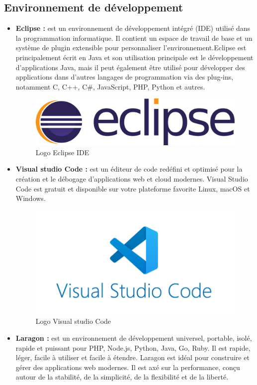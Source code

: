 \subsection[Environnement de développement]{Environnement de développement}
\begin{itemize}
	\item \textbf{Eclipse :} est un environnement de développement intégré (IDE) utilisé dans la programmation informatique. Il contient un espace de travail de base et un système de plugin extensible pour personnaliser l'environnement.Eclipse est principalement écrit en Java et son utilisation principale est le développement d'applications Java, mais il peut également être utilisé pour développer des applications dans d'autres langages de programmation via des plug-ins, notamment C, C++, C\#, JavaScript, PHP, Python et autres.
	\begin{figure}[H]
		\centering
		\includegraphics[width=0.5\linewidth]{img/logos/eclipse}
		\caption[Logo Eclipse IDE]{Logo Eclipse IDE}
		\label{fig:eclipse}
	\end{figure}
	\newpage
	\item \textbf{Visual studio Code : } est un éditeur de code redéfini et optimisé pour la création et le débogage d'applications web et cloud modernes.  Visual Studio Code est gratuit et disponible sur votre plateforme favorite Linux, macOS et Windows.
	\begin{figure}[H]
		\centering
		\includegraphics[width=0.3\linewidth]{img/logos/vscode}
		\caption[Logo Visual studio Code]{Logo Visual studio Code}
		\label{fig:vscode}
	\end{figure}
	\item \textbf{Laragon :} est un environnement de développement universel, portable, isolé, rapide et puissant pour PHP, Node.js, Python, Java, Go, Ruby. Il est rapide, léger, facile à utiliser et facile à étendre. Laragon est idéal pour construire et gérer des applications web modernes. Il est axé sur la performance, conçu autour de la stabilité, de la simplicité, de la flexibilité et de la liberté.

\end{itemize}
